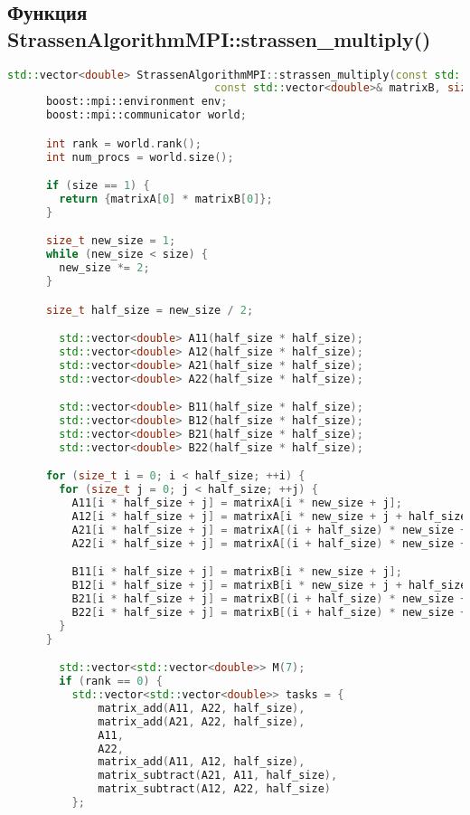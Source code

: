 \documentclass[a4paper,12pt]{article}
\begin{document}
\subsection*{Функция StrassenAlgorithmMPI::strassen\_multiply()}
\begin{lstlisting}[language=C++]
std::vector<double> StrassenAlgorithmMPI::strassen_multiply(const std::vector<double>& matrixA,
                                const std::vector<double>& matrixB, size_t size) {
      boost::mpi::environment env;
      boost::mpi::communicator world;

      int rank = world.rank();
      int num_procs = world.size();

      if (size == 1) {
        return {matrixA[0] * matrixB[0]};
      }

      size_t new_size = 1;
      while (new_size < size) {
        new_size *= 2;
      }

      size_t half_size = new_size / 2;

        std::vector<double> A11(half_size * half_size);
        std::vector<double> A12(half_size * half_size);
        std::vector<double> A21(half_size * half_size);
        std::vector<double> A22(half_size * half_size);

        std::vector<double> B11(half_size * half_size);
        std::vector<double> B12(half_size * half_size);
        std::vector<double> B21(half_size * half_size);
        std::vector<double> B22(half_size * half_size);

      for (size_t i = 0; i < half_size; ++i) {
        for (size_t j = 0; j < half_size; ++j) {
          A11[i * half_size + j] = matrixA[i * new_size + j];
          A12[i * half_size + j] = matrixA[i * new_size + j + half_size];
          A21[i * half_size + j] = matrixA[(i + half_size) * new_size + j];
          A22[i * half_size + j] = matrixA[(i + half_size) * new_size + j + half_size];

          B11[i * half_size + j] = matrixB[i * new_size + j];
          B12[i * half_size + j] = matrixB[i * new_size + j + half_size];
          B21[i * half_size + j] = matrixB[(i + half_size) * new_size + j];
          B22[i * half_size + j] = matrixB[(i + half_size) * new_size + j + half_size];
        }
      }

        std::vector<std::vector<double>> M(7);
        if (rank == 0) {
          std::vector<std::vector<double>> tasks = {
              matrix_add(A11, A22, half_size),
              matrix_add(A21, A22, half_size),
              A11,
              A22,
              matrix_add(A11, A12, half_size),
              matrix_subtract(A21, A11, half_size),
              matrix_subtract(A12, A22, half_size)
          };


\end{lstlisting}
\end{document}
